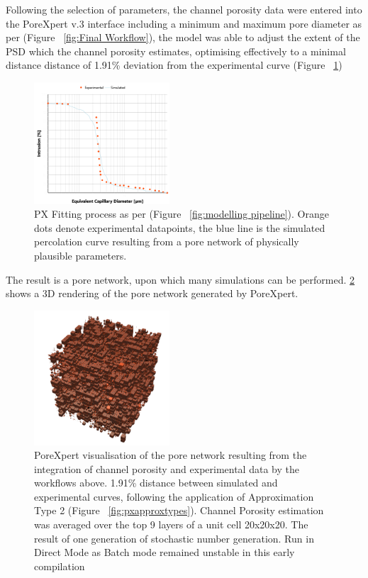 \documentclass[3p,twocolumn]{elsarticle}
\begin{document}
  Following the selection of parameters, the channel porosity data were entered
  into the PoreXpert v.3 interface including a minimum and maximum pore diameter
  as per (Figure ~\ref{fig:Final Workflow}),  the model was able to adjust the
  extent of the PSD which the channel porosity estimates, optimising effectively
  to a minimal distance distance of 1.91\% deviation from the experimental curve
  (Figure ~\ref{fig:PXfittinggraph})
    \begin{figure}
        \centering
        \includegraphics[width=0.45\textwidth]{./Media/Fit to percolation curve.png}
        \caption{PX Fitting process as per (Figure ~\ref{fig:modelling pipeline}). Orange dots denote experimental datapoints, the blue line is the simulated percolation curve resulting from a pore network of physically plausible parameters.}
        \label{fig:PXfittinggraph}
    \end{figure}

  The result is a pore network, upon which many simulations can be performed.
  \ref{fig:PX3dnetwork} shows a 3D rendering of the pore network generated by
  PoreXpert.

      \begin{figure}
        \centering
        \includegraphics[width=0.45\textwidth]{./Media/unit cell no bg.png}
        \caption{PoreXpert visualisation of the pore network resulting from the
        integration of channel porosity and experimental data by the workflows
        above. 1.91\% distance between simulated and experimental curves,
        following the application of Approximation Type 2 (Figure
        ~\ref{fig:pxapproxtypes}). Channel Porosity estimation was averaged over
        the top 9 layers of a unit cell 20x20x20. The result of one generation
        of stochastic number generation. Run in Direct Mode as Batch mode
        remained unstable in this early compilation}
        \label{fig:PX3dnetwork}
    \end{figure}
\end{document}
